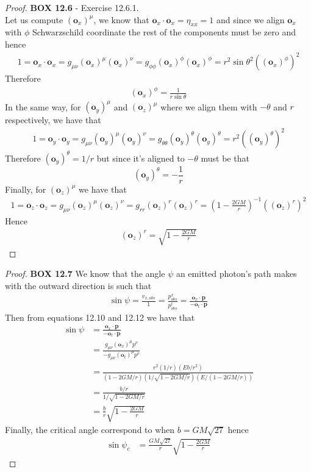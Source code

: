 \documentclass[11pt]{article}
\theoremstyle{definition}
\begin{document}
\begin{proof}{\textbf{BOX 12.6} - Exercise 12.6.1.}\\
    Let us compute $(\bm{o}_x)^\mu$, we know that
    $\bm{o}_x \cdot \bm{o}_x = \eta_{xx} = 1$ and since we align $\bm{o}_x$
    with $\phi$ Schwarzschild coordinate the rest of the components must be
    zero and hence 
    \begin{align*}
        1 = \bm{o}_x \cdot \bm{o}_x = g_{\mu\nu}(\bm{o}_x)^\mu(\bm{o}_x)^\nu
        = g_{\phi\phi}(\bm{o}_x)^\phi(\bm{o}_x)^\phi
        = r^2\sin\theta^2((\bm{o}_x)^\phi)^2
    \end{align*}
    Therefore
    \begin{align*}
        (\bm{o}_x)^\phi = \frac{1}{r\sin\theta}
    \end{align*}
    In the same way, for $(\bm{o}_y)^\mu$ and $(\bm{o}_z)^\mu$ where we align
    them with $-\theta$ and $r$ respectively, we have that
    \begin{align*}
        1 = \bm{o}_y \cdot \bm{o}_y = g_{\mu\nu}(\bm{o}_y)^\mu(\bm{o}_y)^\nu
        = g_{\theta\theta}(\bm{o}_y)^\theta(\bm{o}_y)^\theta
        = r^2((\bm{o}_y)^\theta)^2
    \end{align*}
    Therefore $(\bm{o}_y)^\theta = 1/r$ but since it's aligned to $-\theta$
    must be that
    $$(\bm{o}_y)^\theta = -\frac{1}{r}$$
    Finally, for $(\bm{o}_z)^\mu$ we have that
    \begin{align*}
        1 = \bm{o}_z \cdot \bm{o}_z = g_{\mu\nu}(\bm{o}_z)^\mu(\bm{o}_z)^\nu
        = g_{rr}(\bm{o}_z)^r(\bm{o}_z)^r
        = \left(1 - \frac{2GM}{r}\right)^{-1}((\bm{o}_z)^r)^2
    \end{align*}
    Hence
    \begin{align*}
        (\bm{o}_z)^r = \sqrt{1 - \frac{2GM}{r}}
    \end{align*}
\end{proof}
\cleardoublepage
\begin{proof}{\textbf{BOX 12.7}}
    We know that the angle $\psi$ an emitted photon's path makes with the
    outward direction is such that
    \begin{align*}
        \sin\psi = \frac{v_{x,obs}}{1} = \frac{p^x_{obs}}{p^t_{obs}}
        = \frac{\bm{o}_x \cdot \bm{p}}{-\bm{o}_t\cdot\bm{p}}
    \end{align*}
    Then from equations 12.10 and 12.12 we have that
    \begin{align*}
        \sin\psi &= \frac{\bm{o}_x \cdot \bm{p}}{-\bm{o}_t\cdot\bm{p}}\\
        &= \frac{g_{\mu\nu}(\bm{o}_x)^\mu p^\nu}{-g_{\mu\nu}(\bm{o}_t)^\mu p^\nu}\\
        &= \frac{r^2(1/r)(Eb/r^2)}
        {(1 - 2GM/r)(1/\sqrt{1 - 2GM/r})(E/(1 - 2GM/r))}\\
        &= \frac{b/r}{1/\sqrt{1 - 2GM/r}}\\
        &= \frac{b}{r}\sqrt{1 - \frac{2GM}{r}}
    \end{align*}
    Finally, the critical angle correspond to when $b = GM\sqrt{27}$ hence
    \begin{align*}
        \sin\psi_c &= \frac{GM\sqrt{27}}{r}\sqrt{1 - \frac{2GM}{r}}
    \end{align*}
\end{proof}
\end{document}

